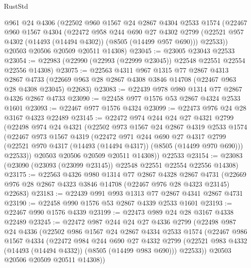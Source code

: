 \begin{lexlean}{RustStd}
\begin{coremodule}
    @961
    @24
    @4306
    (@22502
      @960
      @1567
      @24
      @2867
      @4304
      @2533
      @1574
      (@22467
        @960
        @1567
        @4304
        (@22472
          @958
          @244
          @690
          @27
          @4302
          @2799
          (@22521 @957 @4302 (@14493 (@14494 @4302)) (@8505 (@14499 @957 @690)))
          @22533))
      @20503
      @20506
      @20509
      @20511
      @14308)
@23045 := @23005 @23043 @22533
@23054 := @22983 (@22990 (@22993 (@22999 @23045)) @22548 @22551 @22554 @22556 @14308)
@23075 := @22563
    @4311
    @967
    @1315
    @77
    @2867
    @4313
    @2867
    @4733
    (@22669 @963 @28 @2867 @4308 @3846 @14708 (@22467 @963 @28 @4308 @23045) @22683)
@23083 := @22439 @978 @980 @1314 @77 @2867 @4326 @2867 @4733
@23090 := @22458 @977 @1576 @53 @2867 @4324 @2533 @1601
@23093 := @22467 @977 @1576 @4324
@23099 := @22473 @976 @24 @28 @3167 @4323 @22489
@23145 := @22472
    @974
    @244
    @24
    @27
    @4321
    @2799
    (@22498
      @974
      @24
      @4321
      (@22502
        @973
        @1567
        @24
        @2867
        @4319
        @2533
        @1574
        (@22467
          @973
          @1567
          @4319
          (@22472
            @971
            @244
            @690
            @27
            @4317
            @2799
            (@22521 @970 @4317 (@14493 (@14494 @4317)) (@8505 (@14499 @970 @690)))
            @22533))
        @20503
        @20506
        @20509
        @20511
        @14308))
    @22533
@23154 := @23083 (@23090 (@23093 (@23099 @23145)) @22548 @22551 @22554 @22556 @14308)
@23175 := @22563
    @4326
    @980
    @1314
    @77
    @2867
    @4328
    @2867
    @4731
    (@22669 @976 @28 @2867 @4323 @3846 @14708 (@22467 @976 @28 @4323 @23145) @22683)
@23183 := @22439 @991 @993 @1313 @77 @2867 @4341 @2867 @4731
@23190 := @22458 @990 @1576 @53 @2867 @4339 @2533 @1601
@23193 := @22467 @990 @1576 @4339
@23199 := @22473 @989 @24 @28 @3167 @4338 @22489
@23245 := @22472
    @987
    @244
    @24
    @27
    @4336
    @2799
    (@22498
      @987
      @24
      @4336
      (@22502
        @986
        @1567
        @24
        @2867
        @4334
        @2533
        @1574
        (@22467
          @986
          @1567
          @4334
          (@22472
            @984
            @244
            @690
            @27
            @4332
            @2799
            (@22521 @983 @4332 (@14493 (@14494 @4332)) (@8505 (@14499 @983 @690)))
            @22533))
        @20503
        @20506
        @20509
        @20511
        @14308))

\end{coremodule}
\end{lexlean}
